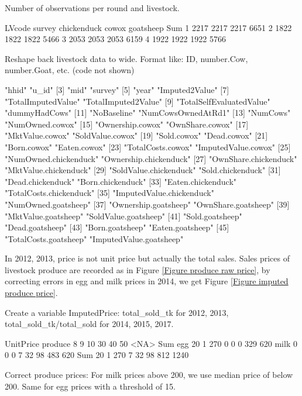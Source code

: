 Number of observations per round and livestock.
\begin{Schunk}
\begin{Soutput}
      LVcode
survey chickenduck cowox goatsheep  Sum
     1        2217  2217      2217 6651
     2        1822  1822      1822 5466
     3        2053  2053      2053 6159
     4        1922  1922      1922 5766
\end{Soutput}
\end{Schunk}
Reshape back livestock data to wide. Format like: ID, number.Cow, number.Goat, etc. (code not shown)
\begin{Schunk}
\begin{Soutput}
 [1] "hhid"                     "u_id"                    
 [3] "mid"                      "survey"                  
 [5] "year"                     "Imputed2Value"           
 [7] "TotalImputedValue"        "TotalImputed2Value"      
 [9] "TotalSelfEvaluatedValue"  "dummyHadCows"            
[11] "NoBaseline"               "NumCowsOwnedAtRd1"       
[13] "NumCows"                  "NumOwned.cowox"          
[15] "Ownership.cowox"          "OwnShare.cowox"          
[17] "MktValue.cowox"           "SoldValue.cowox"         
[19] "Sold.cowox"               "Dead.cowox"              
[21] "Born.cowox"               "Eaten.cowox"             
[23] "TotalCosts.cowox"         "ImputedValue.cowox"      
[25] "NumOwned.chickenduck"     "Ownership.chickenduck"   
[27] "OwnShare.chickenduck"     "MktValue.chickenduck"    
[29] "SoldValue.chickenduck"    "Sold.chickenduck"        
[31] "Dead.chickenduck"         "Born.chickenduck"        
[33] "Eaten.chickenduck"        "TotalCosts.chickenduck"  
[35] "ImputedValue.chickenduck" "NumOwned.goatsheep"      
[37] "Ownership.goatsheep"      "OwnShare.goatsheep"      
[39] "MktValue.goatsheep"       "SoldValue.goatsheep"     
[41] "Sold.goatsheep"           "Dead.goatsheep"          
[43] "Born.goatsheep"           "Eaten.goatsheep"         
[45] "TotalCosts.goatsheep"     "ImputedValue.goatsheep"  
\end{Soutput}
\end{Schunk}

In 2012, 2013, price is not unit price but actually the total sales. Sales prices of livestock produce are recorded as in \textsf{\small Figure \ref{Figure produce raw price}}, by correcting errors in egg and milk prices in 2014, we get \textsf{\small Figure \ref{Figure imputed produce price}}. 

Create a variable \textsf{ImputedPrice}: \textsf{total\_sold\_tk} for 2012, 2013, \textsf{total\_sold\_tk/\textsf{total\_sold}} for 2014, 2015, 2017. \gobblepars
\begin{Schunk}
\begin{Soutput}
       UnitPrice
produce    8    9   10   30   40   50 <NA>  Sum
   egg    20    1  270    0    0    0  329  620
   milk    0    0    0    7   32   98  483  620
   Sum    20    1  270    7   32   98  812 1240
\end{Soutput}
\end{Schunk}
Correct produce prices: For milk prices above 200, we use median price of below 200. Same for egg prices with a threshold of 15. 

